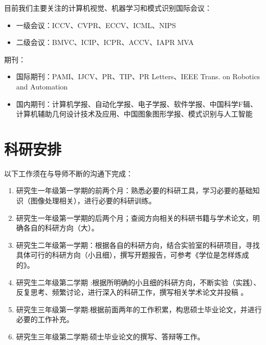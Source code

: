 \documentclass[a4paper，12pt]{article}
\begin{document}
目前我们主要关注的计算机视觉、机器学习和模式识别国际会议：

\begin{itemize}

\item 一级会议：ICCV、CVPR、ECCV、ICML、NIPS

\item 二级会议：BMVC、ICIP、ICPR、ACCV、IAPR MVA

\end{itemize}

期刊：

\begin{itemize}

\item 国际期刊：PAMI、IJCV、PR、TIP、PR Letters、IEEE Trans. on Robotics and Automation

\item 国内期刊：计算机学报、自动化学报、电子学报、软件学报、中国科学F辑、计算机辅助几何设计技术及应用、中国图象图形学报、模式识别与人工智能
\end{itemize}

\section{科研安排}

以下工作须在与导师不断的沟通下完成：

\begin{enumerate}

\item 研究生一年级第一学期的前两个月：熟悉必要的科研工具，学习必要的基础知识（图像处理相关），进行必要的科研训练。

\item 研究生一年级第一学期的后两个月；查阅方向相关的科研书籍与学术论文，明确各自的科研方向（大）。

\item 研究生二年级第一学期：根据各自的科研方向，结合实验室的科研项目，寻找具体可行的科研方向（小且细），撰写开题报告，可参考《学位是怎样炼成的》。

\item 研究生二年级第二学期 :根据所明确的小且细的科研方向，不断实验（实践）、反复思考、频繁讨论，进行深入的科研工作，撰写相关学术论文并投稿 。


\item 研究生三年级第一学期:根据前面两年的工作积累，构思硕士毕业论文，并进行必要的工作补充。

\item 研究生三年级第二学期:硕士毕业论文的撰写、答辩等工作。

\end{enumerate}
\end{document}
